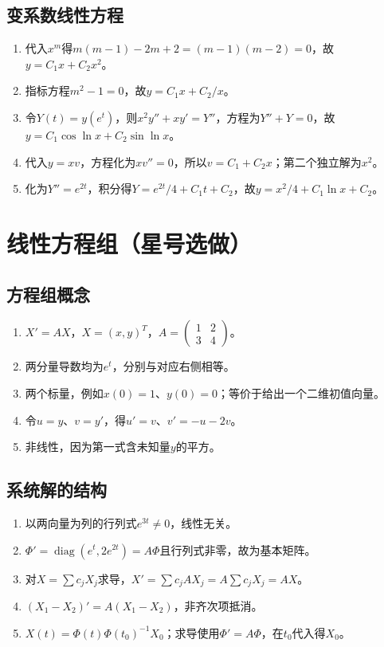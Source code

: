 \documentclass[11pt,a4paper,fontset=fandol]{ctexrep}
\begin{document}
\subsection{变系数线性方程}
\begin{enumerate}
\item 代入$x^m$得$m(m-1)-2m+2=(m-1)(m-2)=0$，故$y=C_1x+C_2x^2$。
\item 指标方程$m^2-1=0$，故$y=C_1x+C_2/x$。
\item 令$Y(t)=y(e^t)$，则$x^2y''+xy'=Y''$，方程为$Y''+Y=0$，故$y=C_1\cos\ln x+C_2\sin\ln x$。
\item 代入$y=xv$，方程化为$xv''=0$，所以$v=C_1+C_2x$；第二个独立解为$x^2$。
\item 化为$Y''=e^{2t}$，积分得$Y=e^{2t}/4+C_1t+C_2$，故$y=x^2/4+C_1\ln x+C_2$。
\end{enumerate}
\section{线性方程组（星号选做）}
\subsection{方程组概念}
\begin{enumerate}
\item $X'=AX$，$X=(x,y)^T$，$A=\begin{pmatrix}1&2\\3&4\end{pmatrix}$。
\item 两分量导数均为$e^t$，分别与对应右侧相等。
\item 两个标量，例如$x(0)=1$、$y(0)=0$；等价于给出一个二维初值向量。
\item 令$u=y$、$v=y'$，得$u'=v$、$v'=-u-2v$。
\item 非线性，因为第一式含未知量$y$的平方。
\end{enumerate}
\subsection{系统解的结构}
\begin{enumerate}
\item 以两向量为列的行列式$e^{3t}\ne0$，线性无关。
\item $\Phi'=\operatorname{diag}(e^t,2e^{2t})=A\Phi$且行列式非零，故为基本矩阵。
\item 对$X=\sum c_jX_j$求导，$X'=\sum c_jAX_j=A\sum c_jX_j=AX$。
\item $(X_1-X_2)'=A(X_1-X_2)$，非齐次项抵消。
\item $X(t)=\Phi(t)\Phi(t_0)^{-1}X_0$；求导使用$\Phi'=A\Phi$，在$t_0$代入得$X_0$。
\end{enumerate}
\end{document}

